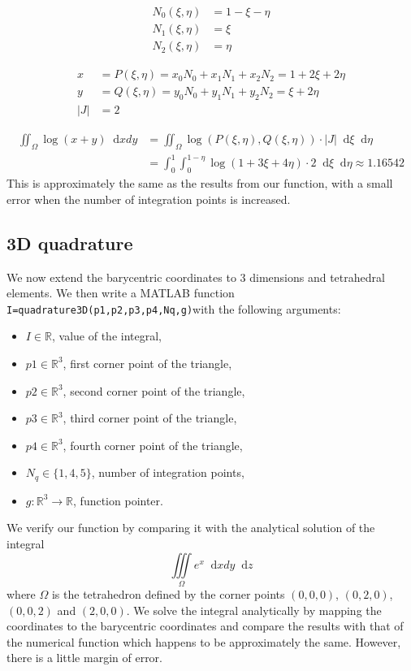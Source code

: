 \documentclass{report}
\renewcommand*\d{\mathop{}\!\mathrm{d}}
\begin{document}
\begin{align}
	N_0 (\xi,\eta)&=1-\xi-\eta\\ 
	N_1 (\xi,\eta)&=\xi\\
	N_2 (\xi,\eta)&=\eta 
\end{align}

\begin{align}
	x&= P(\xi,\eta)= x_0 N_0 +x_1 N_1 +x_2 N_2 = 1+2\xi+2\eta\\
	y&= Q(\xi,\eta)= y_0 N_0 +y_1 N_1 +y_2 N_2 = \xi+2\eta\\ 
	|J| &=2
\end{align}

\begin{align}
	\iint_\Omega \log(x+y) \d xdy
	&= \iint_\Omega \log(P(\xi,\eta), Q(\xi,\eta))  \cdot |J| \d\xi \d\eta\\   
	&= \int_0^1 \int_0^{1-\eta} \log(1+3\xi+4\eta) \cdot 2 \d\xi \d\eta \approx 1.16542
\end{align}
This is approximately the same as the results from our function, with a small error when the number of integration points is increased.

\subsection{3D quadrature}

We now extend the barycentric coordinates to 3 dimensions and tetrahedral elements. We then write a MATLAB function \texttt{I=quadrature3D(p1,p2,p3,p4,Nq,g)}with the following arguments:
\begin{itemize}
	\item $I\in\mathbb{R}$, value of the integral,
	\item $p1\in\mathbb{R}^3$, first corner point of the triangle,
	\item $p2\in\mathbb{R}^3$, second corner point of the triangle,
	\item $p3\in\mathbb{R}^3$, third corner point of the triangle,
	\item $p4\in\mathbb{R}^3$, fourth corner point of the triangle,
	\item $N_q \in{\{1,4,5\}}$, number of integration points,
	\item $g: \mathbb{R}^3 \rightarrow \mathbb{R}$, function pointer.
\end{itemize}

We verify our function by comparing it with the analytical solution of the integral
\begin{equation}
	\iiint \limits_{\Omega} e^x \d x dy  \d z
\end{equation}
where $\Omega$ is the tetrahedron defined by the corner points $(0, 0, 0)$, $(0, 2, 0)$, $(0, 0, 2)$ and $(2, 0, 0)$. We solve the integral analytically by mapping the coordinates to the barycentric coordinates and compare the results with that of the numerical function which happens to be approximately the same. However, there is a little margin of error.  
\end{document}
